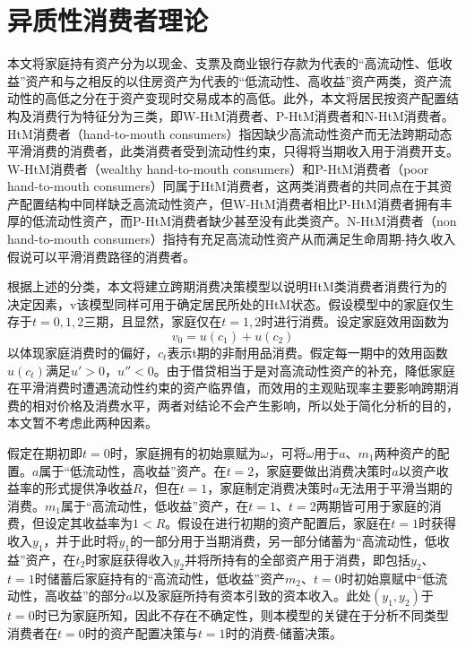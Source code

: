 \documentclass[supercite]{HustGraduPaper}
\begin{document}
    \section{异质性消费者理论}
    本文将家庭持有资产分为以现金、支票及商业银行存款为代表的“高流动性、低收益”资产和与之相反的以住房资产为代表的“低流动性、高收益”资产两类，资产流动性的高低之分在于资产变现时交易成本的高低。此外，本文将居民按资产配置结构及消费行为特征分为三类，即W-HtM消费者、P-HtM消费者和N-HtM消费者。HtM消费者（hand-to-mouth consumers）指因缺少高流动性资产而无法跨期动态平滑消费的消费者，此类消费者受到流动性约束，只得将当期收入用于消费开支。W-HtM消费者（wealthy hand-to-mouth consumers）和P-HtM消费者（poor hand-to-mouth consumers）同属于HtM消费者，这两类消费者的共同点在于其资产配置结构中同样缺乏高流动性资产，但W-HtM消费者相比P-HtM消费者拥有丰厚的低流动性资产，而P-HtM消费者缺少甚至没有此类资产。N-HtM消费者（non hand-to-mouth consumers）指持有充足高流动性资产从而满足生命周期-持久收入假说可以平滑消费路径的消费者。
    
    根据上述的分类，本文将建立跨期消费决策模型以说明HtM类消费者消费行为的决定因素，v该模型同样可用于确定居民所处的HtM状态。假设模型中的家庭仅生存于$t=0,1,2$三期，且显然，家庭仅在$t=1,2$时进行消费。设定家庭效用函数为
    \begin{equation} 
    v_0=u(c_1)+u(c_2) 
    \end{equation}
    以体现家庭消费时的偏好，$c_t$表示t期的非耐用品消费。假定每一期中的效用函数$u(c_t)$满足$u'>0$，$u''<0$。由于借贷相当于是对高流动性资产的补充，降低家庭在平滑消费时遭遇流动性约束的资产临界值，而效用的主观贴现率主要影响跨期消费的相对价格及消费水平，两者对结论不会产生影响，所以处于简化分析的目的，本文暂不考虑此两种因素。

    假定在期初即$t=0$时，家庭拥有的初始禀赋为$\omega$，可将$\omega$用于$a$、$m_1$两种资产的配置。$a$属于“低流动性，高收益”资产。在$t=2$，家庭要做出消费决策时$a$以资产收益率的形式提供净收益$R$，但在$t=1$，家庭制定消费决策时$a$无法用于平滑当期的消费。$m_1$属于“高流动性，低收益”资产，在$t=1$、$t=2$两期皆可用于家庭的消费，但设定其收益率为$1<R$。假设在进行初期的资产配置后，家庭在$t=1$时获得收入$y_1$，并于此时将$y_1$的一部分用于当期消费，另一部分储蓄为“高流动性，低收益”资产，在$t_2$时家庭获得收入$y_2$并将所持有的全部资产用于消费，即包括$y_2$、$t=1$时储蓄后家庭持有的“高流动性，低收益”资产$m_2$、$t=0$时初始禀赋中“低流动性，高收益”的部分$a$以及家庭所持有资本引致的资本收入。此处$(y_1,y_2)$于$t=0$时已为家庭所知，因此不存在不确定性，则本模型的关键在于分析不同类型消费者在$t=0$时的资产配置决策与$t=1$时的消费-储蓄决策。
\end{document}
